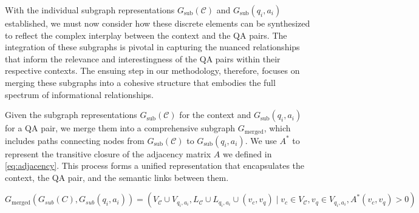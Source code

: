 \documentclass[11pt]{article}
\begin{document}

With the individual subgraph representations \( G_{\text{sub}}(\mathcal{C}) \) and \( G_{\text{sub}}(q_i, a_i) \) established, we must now consider how these discrete elements can be synthesized to reflect the complex interplay between the context and the QA pairs. The integration of these subgraphs is pivotal in capturing the nuanced relationships that inform the relevance and interestingness of the QA pairs within their respective contexts. The ensuing step in our methodology, therefore, focuses on merging these subgraphs into a cohesive structure that embodies the full spectrum of informational relationships.

Given the subgraph representations \( G_{\text{sub}}(\mathcal{C}) \) for the context and \( G_{\text{sub}}(q_i, a_i) \) for a QA pair, we merge them into a comprehensive subgraph \( G_{\text{merged}} \), which includes paths connecting nodes from \( G_{\text{sub}}(\mathcal{C}) \) to \( G_{\text{sub}}(q_i, a_i) \). We use $A^*$ to represent the transitive closure of the adjacency matrix $A$ we defined in \eqref{eq:adjacency}. This process forms a unified representation that encapsulates the context, the QA pair, and the semantic links between them.


\begin{equation}
\label{eq:merged_subgraph}
G_{\text{merged}}(G_{sub}(C), G_{sub}(q_i,a_i)) = (V_{\mathcal{C}} \cup V_{q_i, a_i}, L_{\mathcal{C}} \cup L_{q_i, a_i} \cup { (v_c, v_q) \mid v_c \in V_{\mathcal{C}}, v_q \in V_{q_i, a_i}, A^{*}(v_c, v_q) > 0 })
\end{equation}
\end{document}
